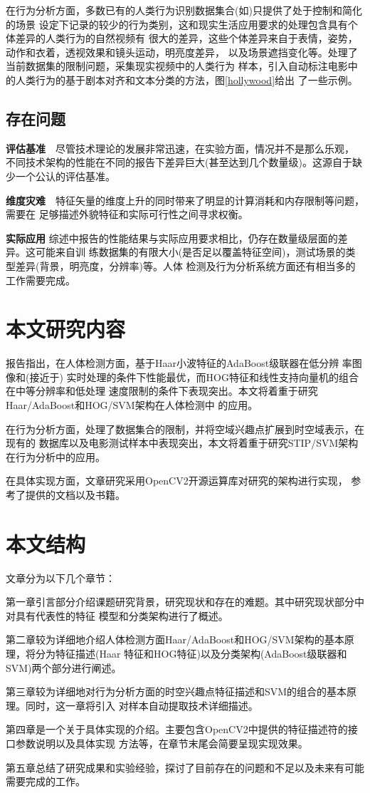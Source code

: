 
在行为分析方面，多数已有的人类行为识别数据集合(如\cite{kth})只提供了处于控制和简化的场景
设定下记录的较少的行为类别，这和现实生活应用要求的处理包含具有个体差异的人类行为的自然视频有
很大的差异，这些个体差异来自于表情，姿势，动作和衣着，透视效果和镜头运动，明亮度差异，
以及场景遮挡变化等。\cite{stip}处理了当前数据集的限制问题，采集现实视频中的人类行为
样本，引入自动标注电影中的人类行为的基于剧本对齐和文本分类的方法，图\ref{hollywood}给出
了一些示例。

\subsection{存在问题}
\textbf{评估基准}~~尽管技术理论的发展非常迅速，在实验方面，情况并不是那么乐观，
不同技术架构的性能在不同的报告下差异巨大(甚至达到几个数量级)。这源自于缺少一个公认的评估基准。

\textbf{维度灾难}~~特征矢量的维度上升的同时带来了明显的计算消耗和内存限制等问题，需要在
足够描述外貌特征和实际可行性之间寻求权衡。

\textbf{实际应用}
综述\cite{survey}中报告的性能结果与实际应用要求相比，仍存在数量级层面的差异。这可能来自训
练数据集的有限大小(是否足以覆盖特征空间)，测试场景的类型差异(背景，明亮度，分辨率)等。人体
检测及行为分析系统方面还有相当多的工作需要完成。
\section{本文研究内容}
\cite{survey}报告指出，在人体检测方面，基于Haar小波特征的AdaBoost级联器\cite{haar}在低分辨
率图像和(接近于)
实时处理的条件下性能最优，而HOG特征和线性支持向量机的组合\cite{DT2005}在中等分辨率和低处理
速度限制的条件下表现突出。本文将着重于研究Haar/AdaBoost和HOG/SVM架构在人体检测中
的应用。

在行为分析方面，\cite{stip}处理了数据集合的限制，并将空域兴趣点扩展到时空域表示，在现有的
数据库以及电影测试样本中表现突出，本文将着重于研究STIP/SVM架构在行为分析中的应用。

在具体实现方面，文章研究采用OpenCV2开源运算库\cite{opencv}对研究的架构进行实现，
参考了\cite{opencvdoc}提供的文档以及\cite{opencvbook}书籍。
\section{本文结构}
文章分为以下几个章节：

第一章引言部分介绍课题研究背景，研究现状和存在的难题。其中研究现状部分中对具有代表性的特征
模型和分类架构进行了概述。

第二章较为详细地介绍人体检测方面Haar/AdaBoost和HOG/SVM架构的基本原理，将分为特征描述(Haar
特征和HOG特征)以及分类架构(AdaBoost级联器和SVM)两个部分进行阐述。

第三章较为详细地对行为分析方面的时空兴趣点特征描述和SVM的组合的基本原理。同时，这一章将引入
对样本自动提取技术详细描述。

第四章是一个关于具体实现的介绍。主要包含OpenCV2中提供的特征描述符的接口参数说明以及具体实现
方法等，在章节末尾会简要呈现实现效果。

第五章总结了研究成果和实验经验，探讨了目前存在的问题和不足以及未来有可能需要完成的工作。
